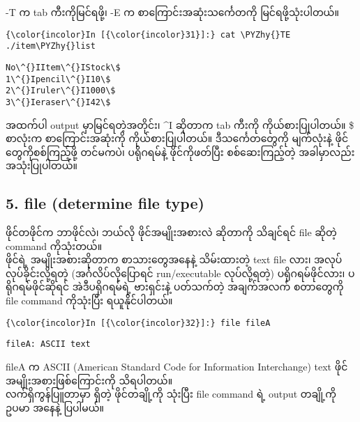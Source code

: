 \documentclass[11pt]{article}
\def\PYZhy{\char`\-}
\begin{document}
-T က tab ကီးကိုမြင်ရဖို့၊ -E က စာကြောင်းအဆုံးသင်္ကေတကို
မြင်ရဖို့သုံးပါတယ်။

    \begin{Verbatim}[commandchars=\\\{\}]
{\color{incolor}In [{\color{incolor}31}]:} cat \PYZhy{}TE ./item\PYZhy{}list
\end{Verbatim}

    \begin{Verbatim}[commandchars=\\\{\}]
No\^{}IItem\^{}IStock\$
1\^{}Ipencil\^{}I10\$
2\^{}Iruler\^{}I1000\$
3\^{}Ieraser\^{}I42\$

    \end{Verbatim}

    အထက်ပါ output မှာမြင်ရတဲ့အတိုင်း၊ \^{}I ဆိုတာက tab ကီးကို
ကိုယ်စားပြုပါတယ်။ \$ စာလုံးက စာကြောင်းအဆုံးကို ကိုယ်စားပြုပါတယ်။
ဒီသင်္ကေတတွေကို မျက်လုံးနဲ့ ဖိုင်တွေကိုစစ်ကြည့်ဖို့ တင်မကပဲ၊ ပရိုဂရမ်နဲ့
ဖိုင်ကိုဖတ်ပြီး စစ်ဆေးကြည့်တဲ့ အခါမှာလည်း အသုံးပြုပါတယ်။

    \subsection{5. file (determine file
type)}\label{file-determine-file-type}

ဖိုင်တဖိုင်က ဘာဖိုင်လဲ၊ ဘယ်လို ဖိုင်အမျိုးအစားလဲ ဆိုတာကို သိချင်ရင် file
ဆိုတဲ့ command ကိုသုံးတယ်။\\
ဖိုင်ရဲ့ အမျိုးအစားဆိုတာက စာသားတွေအနေနဲ့ သိမ်းထားတဲ့ text file လား၊
အလုပ်လုပ်ခိုင်းလို့ရတဲ့ (အင်္ဂလိပ်လိုပြောရင် run/executable
လုပ်လို့ရတဲ့) ပရိုဂရမ်ဖိုင်လား၊ ပရိုဂရမ်ဖိုင်ဆိုရင် အဲဒီပရိုဂရမ်ရဲ့
ဗားရှင်းနဲ့ ပတ်သက်တဲ့ အချက်အလက် စတာတွေကို file command ကိုသုံးပြီး
ရယူနိုင်ပါတယ်။

    \begin{Verbatim}[commandchars=\\\{\}]
{\color{incolor}In [{\color{incolor}32}]:} file fileA
\end{Verbatim}

    \begin{Verbatim}[commandchars=\\\{\}]
fileA: ASCII text

    \end{Verbatim}

    fileA က ASCII (American Standard Code for Information Interchange) text
ဖိုင် အမျိုးအစားဖြစ်ကြောင်းကို သိရပါတယ်။\\
လက်ရှိကွန်ပြူတာမှာ ရှိတဲ့ ဖိုင်တချို့ကို သုံးပြီး file command ရဲ့
output တချို့ကို ဥပမာ အနေနဲ့ ပြပါမယ်။
\end{document}
